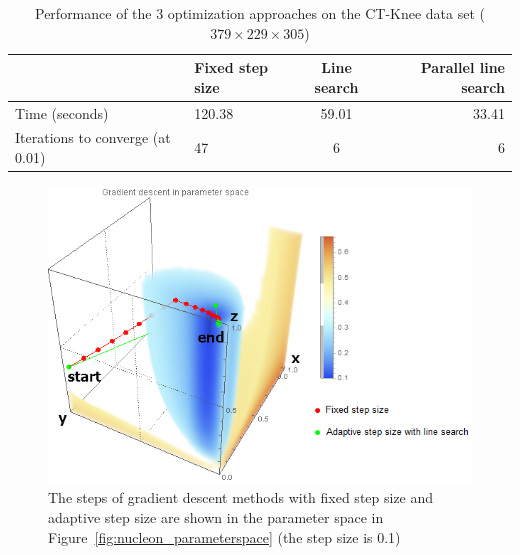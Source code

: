 \begin{table}[h]
	\begin{tabular}{ l | l c r }
		& Fixed step size & Line search & Parallel line search \\
		\hline
		Time (seconds) & 120.38 & 59.01 & 33.41 \\
		Iterations to converge (at 0.01) & 47 & 6 & 6 \\
	\end{tabular}
	\caption[Table caption text]{Performance of the 3 optimization approaches on the CT-Knee data set ($ 379 \times 229 \times 305 $)}
	\label{table:CT-Knee_table}
\end{table}

\begin{figure}
	\centering
	\begin{minipage}{.9\textwidth}
		\includegraphics[width=1\linewidth]{images/nucleon_strong_red_parameterspace_path}
	\end{minipage}
	\caption{The steps of gradient descent methods with fixed step size and adaptive step size are shown in the parameter space in Figure~\ref{fig:nucleon_parameterspace} (the step size is 0.1)}
	\label{fig:nucleon_parameterspace_path}
\end{figure}

